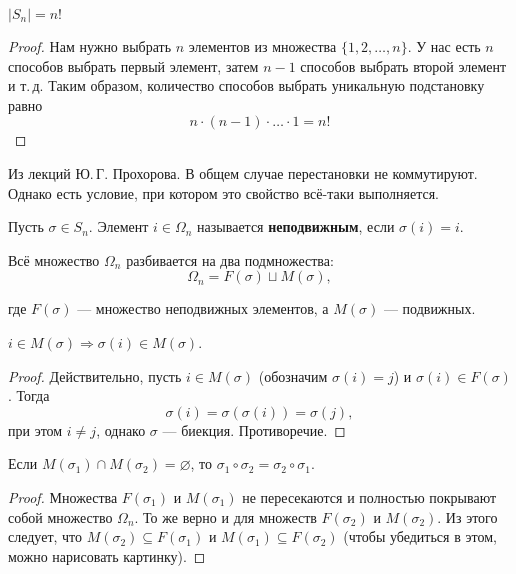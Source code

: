 \begin{statement}
    $|S_n| = n!$
\end{statement}

\begin{proof}
    Нам нужно выбрать $n$ элементов из множества $\{1, 2, \ldots, n\}$. У нас есть $n$ способов выбрать первый элемент, затем $n - 1$ способов выбрать второй элемент и т.\,д. Таким образом, количество способов выбрать уникальную подстановку равно
    $$
    n \cdot (n - 1) \cdot \ldots \cdot 1 = n!
    $$
\end{proof}

\begin{remark}
    Из лекций Ю.\,Г. Прохорова. В общем случае перестановки не коммутируют. Однако есть условие, при котором это свойство всё-таки выполняется.

    \begin{definition}
        Пусть $\sigma \in S_n$. Элемент $i \in \Omega_n$ называется \textbf{неподвижным}, если $\sigma(i) = i$.
    \end{definition}

    Всё множество $\Omega_n$ разбивается на два подмножества:
    $$
    \Omega_n = F(\sigma) \sqcup M(\sigma),
    $$

    где $F(\sigma)$ --- множество неподвижных элементов, а $M(\sigma)$ --- подвижных.

    \begin{lemma}
        $i \in M(\sigma) \Rightarrow \sigma(i) \in M(\sigma)$.
    \end{lemma}

    \begin{proof}
        Действительно, пусть $i \in M(\sigma)$ (обозначим $\sigma(i) = j$) и $\sigma(i) \in F(\sigma)$. Тогда
        $$
        \sigma(i) = \sigma(\sigma(i)) = \sigma(j),
        $$
        при этом $i \ne j$, однако $\sigma$ --- биекция. Противоречие.
    \end{proof}

    \begin{theorem}
        Если $M(\sigma_1) \cap M(\sigma_2) = \varnothing$, то $\sigma_1 \circ \sigma_2 = \sigma_2 \circ \sigma_1$.
    \end{theorem}

    \begin{proof}
        Множества $F(\sigma_1)$ и $M(\sigma_1)$ не пересекаются и полностью покрывают собой множество $\Omega_n$. То же верно и для множеств $F(\sigma_2)$ и $M(\sigma_2)$. Из этого следует, что $M(\sigma_2) \subseteq F(\sigma_1)$ и $M(\sigma_1) \subseteq F(\sigma_2)$ (чтобы убедиться в этом, можно нарисовать картинку).


\end{proof}
\end{remark}
